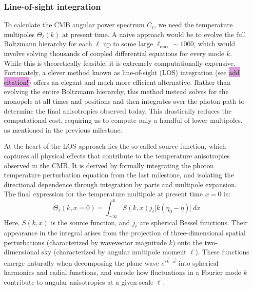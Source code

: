 \documentclass{aa}
\numberwithin{equation}{section}
\numberwithin{table}{section}
\numberwithin{figure}{section}
\begin{document}
\subsubsection{Line-of-sight integration}
To calculate the CMB angular power spectrum $C_\ell$, we need the temperature multipoles $\Theta_\ell(k)$ at present time. A naive approach would be to evolve the full Boltzmann hierarchy for each $\ell$ up to some large $\ell_{\text{max}} \sim 1000$, which would involve solving thousands of coupled differential equations for every mode $k$. While this is theoretically feasible, it is extremely computationally expensive. Fortunately, a clever method known as line-of-sight (LOS) integration (see \colorbox{Plum}{add citation!}) offers an elegant and much more efficient alternative.
Rather than evolving the entire Boltzmann hierarchy, this method instead solves for the monopole at all times and positions and then integrates over the photon path to determine the final anisotropies observed today. This drastically reduces the computational cost, requiring us to compute only a handful of lower multipoles, as mentioned in the previous milestone.

At the heart of the LOS approach lies the so-called source function, which captures all physical effects that contribute to the temperature anisotropies observed in the CMB. It is derived by formally integrating the photon temperature perturbation equation from the last milestone, and isolating the directional dependence through integration by parts and multipole expansion. The final expression for the temperature multipole at present time $x = 0$ is:
\begin{equation}
\Theta_\ell(k, x=0) = \int_{-\infty}^{0} \tilde{S}(k, x) j_\ell\big[k(\eta_0 - \eta)\big]\, dx \label{eq: multipoles LOS}
\end{equation}
Here, $\tilde{S}(k, x)$ is the source function, and $j_\ell$ are spherical Bessel functions. Their appearance in the integral arises from the projection of three-dimensional spatial perturbations (characterized by wavevector magnitude $k$) onto the two-dimensional sky (characterized by angular multipole moment $\ell$). These functions emerge naturally when decomposing the plane wave $e^{i \vec{k} \cdot \vec{x}}$ into spherical harmonics and radial functions, and encode how fluctuations in a Fourier mode $k$ contribute to angular anisotropies at a given scale $\ell$. 
\end{document}
